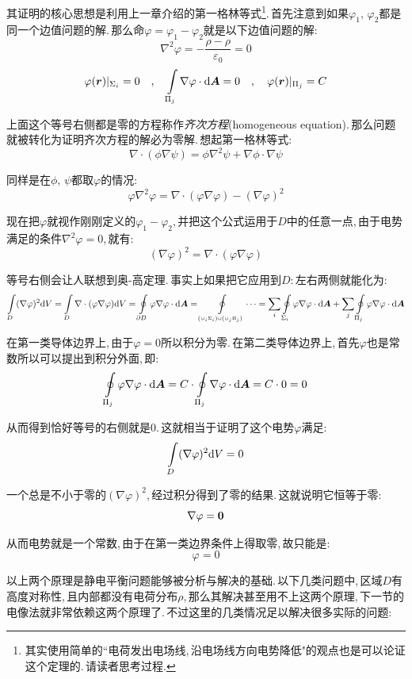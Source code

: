 其证明的核心思想是利用上一章介绍的第一格林等式\footnote{其实使用简单的``电荷发出电场线,\,沿电场线方向电势降低"的观点也是可以论证这个定理的.\,请读者思考过程.}.\,首先注意到如果$\varphi_1,\,\varphi_2$都是同一个边值问题的解.\,那么命$\varphi=\varphi_1-\varphi_2$就是以下边值问题的解:
\[\nabla^2\varphi=-\frac{\rho-\rho}{\varepsilon_0}=0\]
\[\varphi(\boldsymbol{r})|_{\Sigma_i}=0 \quad, \quad \int\limits_{\Pi_j}\nabla\varphi\cdot \textrm{d} \boldsymbol{A}=0 \quad, \quad \varphi(\boldsymbol{r})|_{\Pi_j}=C\]

上面这个等号右侧都是零的方程称作\emph{齐次方程}(homogeneous equation).\,那么问题就被转化为证明齐次方程的解必为零解.\,想起第一格林等式:
\[\nabla\cdot(\phi\nabla\psi)=\phi\nabla^2\psi+\nabla\phi\cdot\nabla\psi\]

同样是在$\phi,\,\psi$都取$\varphi$的情况:
\[\varphi\nabla^2\varphi=\nabla\cdot(\varphi\nabla\varphi)-(\nabla\varphi)^2\]

现在把$\varphi$就视作刚刚定义的$\varphi_1-\varphi_2$,\,并把这个公式运用于$D$中的任意一点,\,由于电势满足的条件$\nabla^2\varphi=0$,\,就有:
\[(\nabla\varphi)^2=\nabla\cdot(\varphi \nabla\varphi)\]

等号右侧会让人联想到奥-高定理.\,事实上如果把它应用到$D$:\,左右两侧就能化为:
\[\int\limits_D(\nabla\varphi)^2\textrm{d} V=\int\limits_D \nabla\cdot(\varphi \nabla\varphi)\textrm{d} V=\oint\limits_{\partial D}\varphi\nabla\varphi \cdot \textrm{d} \boldsymbol{A}=\oint\limits_{\scriptscriptstyle\left(\cup_i \Sigma_i\right)\cup \left(\cup_j\Pi_j  \right)}\cdots=\sum_i \oint\limits_{\Sigma_i}\varphi\nabla\varphi \cdot \textrm{d} \boldsymbol{A}+\sum_j \oint\limits_{\Pi_j}\varphi\nabla\varphi \cdot \textrm{d} \boldsymbol{A}\]

在第一类导体边界上,\,由于$\varphi=0$所以积分为零.\,在第二类导体边界上,\,首先$\varphi$也是常数所以可以提出到积分外面,\,即:
\[\oint\limits_{\Pi_j}\varphi\nabla\varphi \cdot \textrm{d} \boldsymbol{A}=C\cdot\oint\limits_{\Pi_j}\nabla\varphi \cdot \textrm{d} \boldsymbol{A}=C\cdot 0=0\]

从而得到恰好等号的右侧就是$0$.\,这就相当于证明了这个电势$\varphi$满足:
\[\int\limits_D(\nabla\varphi)^2\textrm{d} V=0\]

一个总是不小于零的$(\nabla\varphi)^2$,\,经过积分得到了零的结果.\,这就说明它恒等于零:
\[\nabla\varphi=\boldsymbol{0}\]

从而电势就是一个常数,\,由于在第一类边界条件上得取零,\,故只能是:
\[\varphi=0\]


以上两个原理是静电平衡问题能够被分析与解决的基础.\,以下几类问题中,\,区域$D$有高度对称性,\,且内部都没有电荷分布$\rho$,\,那么其解决甚至用不上这两个原理,\,下一节的电像法就非常依赖这两个原理了.\,不过这里的几类情况足以解决很多实际的问题:

